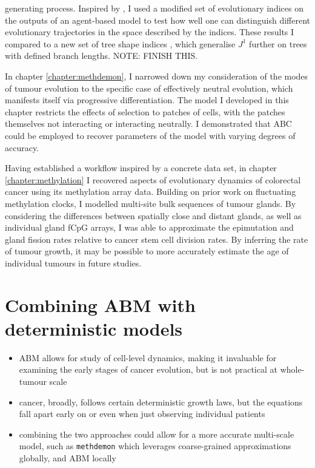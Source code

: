 generating process. Inspired by \cite{noble_spatial_2022}, I used a modified set
of evolutionary indices on the outputs of an agent-based model to test how well
one can distinguish different evolutionary trajectories in the space described
by the indices. These results I compared to a new set of tree shape indices
\cite{noble_new_2023}, which generalise $J^1$ further on trees with defined
branch lengths. NOTE: FINISH THIS. \par
In chapter \ref{chapter:methdemon}, I narrowed down my consideration of the
modes of tumour evolution to the specific case of effectively neutral evolution,
which manifests itself via progressive differentiation. The model I developed in
this chapter restricts the effects of selection to patches of cells, with the
patches themselves not interacting or interacting neutrally. I demonstrated that
ABC could be employed to recover parameters of the model with varying degrees of
accuracy. \par
Having established a workflow inspired by a concrete data set, in chapter
\ref{chapter:methylation} I recovered aspects of evolutionary dynamics of
colorectal cancer using its methylation array data. Building on prior work on
fluctuating methylation clocks, I modelled multi-site bulk sequences of tumour
glands. By considering the differences between spatially close and distant
glands, as well as individual gland fCpG arrays, I was able to approximate the
epimutation and gland fission rates relative to cancer stem cell division rates.
By inferring the rate of tumour growth, it may be possible to more accurately
estimate the age of individual tumours in future studies.

\section{Combining ABM with deterministic models}
\begin{itemize}
    \item ABM allows for study of cell-level dynamics, making it invaluable for
    examining the early stages of cancer evolution, but is not practical at
    whole-tumour scale
    \item cancer, broadly, follows certain deterministic growth laws, but the
    equations fall apart early on or even when just observing individual
    patients
    \item combining the two approaches could allow for a more accurate
    multi-scale model, such as \texttt{methdemon} which leverages coarse-grained
    approximations globally, and ABM locally
\end{itemize}

